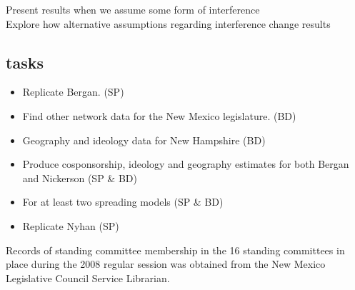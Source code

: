 \documentclass[12pt]{article}
\begin{document}
Present results when we assume some form of interference \\
Explore how alternative assumptions regarding interference change results



\subsection{tasks}
\begin{itemize}
\item Replicate Bergan. (SP)
\item Find other network data for the New Mexico legislature. (BD)
\item Geography and ideology data for New Hampshire (BD)
\item Produce cosponsorship, ideology and geography estimates for both Bergan and Nickerson (SP \& BD)
\item For at least two spreading models (SP \& BD)
\item Replicate Nyhan (SP)
\end{itemize}


Records of standing committee membership in the 16 standing committees in place during the 2008 regular session was obtained from the New Mexico Legislative Council Service Librarian. 
\end{document}

